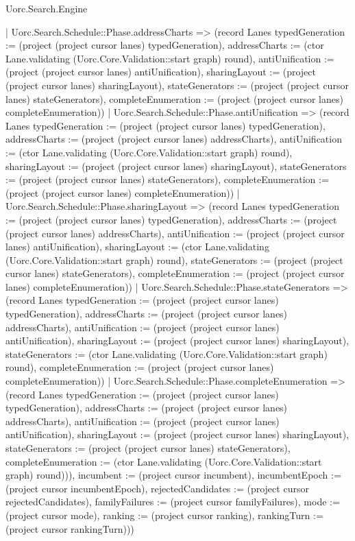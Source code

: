 \begin{lexlean}{Uorc.Search.Engine}
\begin{semanticmodule}
{{        | Uorc.Search.Schedule::Phase.addressCharts => (record Lanes {typedGeneration := (project (project cursor lanes) typedGeneration), addressCharts := (ctor Lane.validating (Uorc.Core.Validation::start graph) round), antiUnification := (project (project cursor lanes) antiUnification), sharingLayout := (project (project cursor lanes) sharingLayout), stateGenerators := (project (project cursor lanes) stateGenerators), completeEnumeration := (project (project cursor lanes) completeEnumeration)})
        | Uorc.Search.Schedule::Phase.antiUnification => (record Lanes {typedGeneration := (project (project cursor lanes) typedGeneration), addressCharts := (project (project cursor lanes) addressCharts), antiUnification := (ctor Lane.validating (Uorc.Core.Validation::start graph) round), sharingLayout := (project (project cursor lanes) sharingLayout), stateGenerators := (project (project cursor lanes) stateGenerators), completeEnumeration := (project (project cursor lanes) completeEnumeration)})
        | Uorc.Search.Schedule::Phase.sharingLayout => (record Lanes {typedGeneration := (project (project cursor lanes) typedGeneration), addressCharts := (project (project cursor lanes) addressCharts), antiUnification := (project (project cursor lanes) antiUnification), sharingLayout := (ctor Lane.validating (Uorc.Core.Validation::start graph) round), stateGenerators := (project (project cursor lanes) stateGenerators), completeEnumeration := (project (project cursor lanes) completeEnumeration)})
        | Uorc.Search.Schedule::Phase.stateGenerators => (record Lanes {typedGeneration := (project (project cursor lanes) typedGeneration), addressCharts := (project (project cursor lanes) addressCharts), antiUnification := (project (project cursor lanes) antiUnification), sharingLayout := (project (project cursor lanes) sharingLayout), stateGenerators := (ctor Lane.validating (Uorc.Core.Validation::start graph) round), completeEnumeration := (project (project cursor lanes) completeEnumeration)})
        | Uorc.Search.Schedule::Phase.completeEnumeration => (record Lanes {typedGeneration := (project (project cursor lanes) typedGeneration), addressCharts := (project (project cursor lanes) addressCharts), antiUnification := (project (project cursor lanes) antiUnification), sharingLayout := (project (project cursor lanes) sharingLayout), stateGenerators := (project (project cursor lanes) stateGenerators), completeEnumeration := (ctor Lane.validating (Uorc.Core.Validation::start graph) round)})), incumbent := (project cursor incumbent), incumbentEpoch := (project cursor incumbentEpoch), rejectedCandidates := (project cursor rejectedCandidates), familyFailures := (project cursor familyFailures), mode := (project cursor mode), ranking := (project cursor ranking), rankingTurn := (project cursor rankingTurn)}))
}
\end{semanticmodule}
\end{lexlean}
